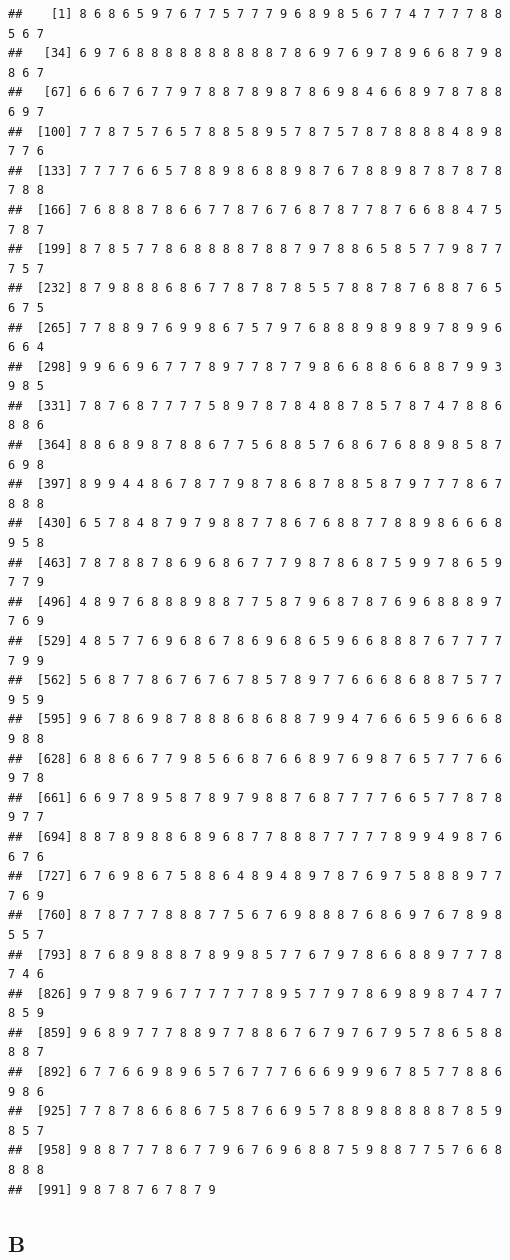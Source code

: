 \documentclass[
]{article}
\begin{document}
\begin{verbatim}
##    [1] 8 6 8 6 5 9 7 6 7 7 5 7 7 7 9 6 8 9 8 5 6 7 7 4 7 7 7 7 8 8 5 6 7
##   [34] 6 9 7 6 8 8 8 8 8 8 8 8 8 8 7 8 6 9 7 6 9 7 8 9 6 6 8 7 9 8 8 6 7
##   [67] 6 6 6 7 6 7 7 9 7 8 8 7 8 9 8 7 8 6 9 8 4 6 6 8 9 7 8 7 8 8 6 9 7
##  [100] 7 7 8 7 5 7 6 5 7 8 8 5 8 9 5 7 8 7 5 7 8 7 8 8 8 8 4 8 9 8 7 7 6
##  [133] 7 7 7 7 6 6 5 7 8 8 9 8 6 8 8 9 8 7 6 7 8 8 9 8 7 8 7 8 7 8 7 8 8
##  [166] 7 6 8 8 8 7 8 6 6 7 7 8 7 6 7 6 8 7 8 7 7 8 7 6 6 8 8 4 7 5 7 8 7
##  [199] 8 7 8 5 7 7 8 6 8 8 8 8 7 8 8 7 9 7 8 8 6 5 8 5 7 7 9 8 7 7 7 5 7
##  [232] 8 7 9 8 8 8 6 8 6 7 7 8 7 8 7 8 5 5 7 8 8 7 8 7 6 8 8 7 6 5 6 7 5
##  [265] 7 7 8 8 9 7 6 9 9 8 6 7 5 7 9 7 6 8 8 8 9 8 9 8 9 7 8 9 9 6 6 6 4
##  [298] 9 9 6 6 9 6 7 7 7 8 9 7 7 8 7 7 9 8 6 6 8 8 6 6 8 8 7 9 9 3 9 8 5
##  [331] 7 8 7 6 8 7 7 7 7 5 8 9 7 8 7 8 4 8 8 7 8 5 7 8 7 4 7 8 8 6 8 8 6
##  [364] 8 8 6 8 9 8 7 8 8 6 7 7 5 6 8 8 5 7 6 8 6 7 6 8 8 9 8 5 8 7 6 9 8
##  [397] 8 9 9 4 4 8 6 7 8 7 7 9 8 7 8 6 8 7 8 8 5 8 7 9 7 7 7 8 6 7 8 8 8
##  [430] 6 5 7 8 4 8 7 9 7 9 8 8 7 7 8 6 7 6 8 8 7 7 8 8 9 8 6 6 6 8 9 5 8
##  [463] 7 8 7 8 8 7 8 6 9 6 8 6 7 7 7 9 8 7 8 6 8 7 5 9 9 7 8 6 5 9 7 7 9
##  [496] 4 8 9 7 6 8 8 8 9 8 8 7 7 5 8 7 9 6 8 7 8 7 6 9 6 8 8 8 9 7 7 6 9
##  [529] 4 8 5 7 7 6 9 6 8 6 7 8 6 9 6 8 6 5 9 6 6 8 8 8 7 6 7 7 7 7 7 9 9
##  [562] 5 6 8 7 7 8 6 7 6 7 6 7 8 5 7 8 9 7 7 6 6 6 8 6 8 8 7 5 7 7 9 5 9
##  [595] 9 6 7 8 6 9 8 7 8 8 8 6 8 6 8 8 7 9 9 4 7 6 6 6 5 9 6 6 6 8 9 8 8
##  [628] 6 8 8 6 6 7 7 9 8 5 6 6 8 7 6 6 8 9 7 6 9 8 7 6 5 7 7 7 6 6 9 7 8
##  [661] 6 6 9 7 8 9 5 8 7 8 9 7 9 8 8 7 6 8 7 7 7 7 6 6 5 7 7 8 7 8 9 7 7
##  [694] 8 8 7 8 9 8 8 6 8 9 6 8 7 7 8 8 8 7 7 7 7 7 8 9 9 4 9 8 7 6 6 7 6
##  [727] 6 7 6 9 8 6 7 5 8 8 6 4 8 9 4 8 9 7 8 7 6 9 7 5 8 8 8 9 7 7 7 6 9
##  [760] 8 7 8 7 7 7 8 8 8 7 7 5 6 7 6 9 8 8 8 7 6 8 6 9 7 6 7 8 9 8 5 5 7
##  [793] 8 7 6 8 9 8 8 8 7 8 9 9 8 5 7 7 6 7 9 7 8 6 6 8 8 9 7 7 7 8 7 4 6
##  [826] 9 7 9 8 7 9 6 7 7 7 7 7 7 8 9 5 7 7 9 7 8 6 9 8 9 8 7 4 7 7 8 5 9
##  [859] 9 6 8 9 7 7 7 8 8 9 7 7 8 8 6 7 6 7 9 7 6 7 9 5 7 8 6 5 8 8 8 8 7
##  [892] 6 7 7 6 6 9 8 9 6 5 7 6 7 7 7 6 6 6 9 9 9 6 7 8 5 7 7 8 8 6 9 8 6
##  [925] 7 7 8 7 8 6 6 8 6 7 5 8 7 6 6 9 5 7 8 8 9 8 8 8 8 8 7 8 5 9 8 5 7
##  [958] 9 8 8 7 7 7 8 6 7 7 9 6 7 6 9 6 8 8 7 5 9 8 8 7 7 5 7 6 6 8 8 8 8
##  [991] 9 8 7 8 7 6 7 8 7 9
\end{verbatim}

\hypertarget{b-2}{%
\subsection{B}\label{b-2}}
\end{document}
